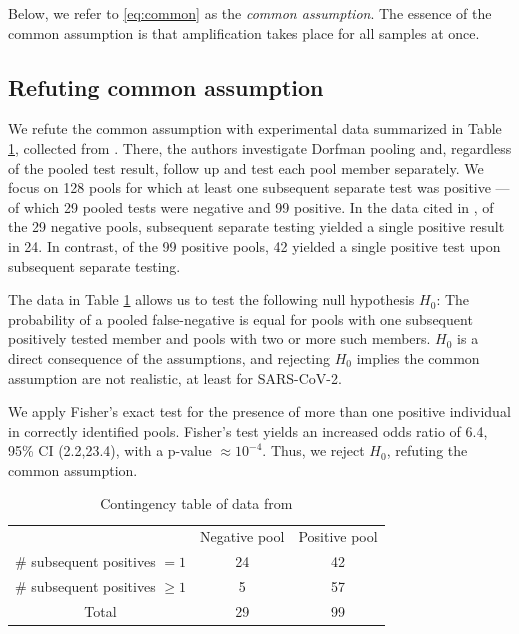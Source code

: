 \documentclass{article}
\begin{document}
Below, we refer to \eqref{eq:common} as the \emph{common
  assumption}. The essence of the common assumption is that
amplification takes place for all samples at once.


\subsection{Refuting common assumption}\label{subsec:refute}
We refute the common assumption with experimental data summarized in
Table \ref{table}, collected from \cite{Salazar}. There, the authors
investigate Dorfman pooling and, regardless of the pooled test result,
follow up and test each pool member separately. We focus on 128 pools
for which at least one subsequent separate test was positive --- of
which 29 pooled tests were negative and 99 positive. In the data cited
in \cite{Salazar}, of the 29 negative pools, subsequent separate
testing yielded a single positive result in 24. In contrast, of the 99
positive pools, 42 yielded a single positive test upon subsequent
separate testing.

The data in Table \ref{table} allows us to test the following null
hypothesis $H_0$: The probability of a pooled false-negative is equal
for pools with one subsequent positively tested member and pools with
two or more such members. $H_0$ is a direct consequence of the
assumptions, and rejecting $H_0$ implies the common assumption are not
realistic, at least for SARS-CoV-2.

We apply Fisher's exact test for the presence of more than one
positive individual in correctly identified pools. Fisher's test
yields an increased odds ratio of 6.4, 95\% CI (2.2,23.4), with a
p-value $\approx 10^{-4}$. Thus, we reject $H_0$, refuting the common
assumption.

\begin{table}[h]
\centering
\begin{tabular}{ c c c }
                                & Negative pool  & Positive pool \\%
\# subsequent positives $=1$    & 24             & 42            \\%
\# subsequent positives $\geq1$ & 5              & 57            \\%
 Total                          & 29             & 99            \\%
\end{tabular}
\caption{Contingency table of data from \cite{Salazar}}\label{table}
\end{table}
\end{document}
